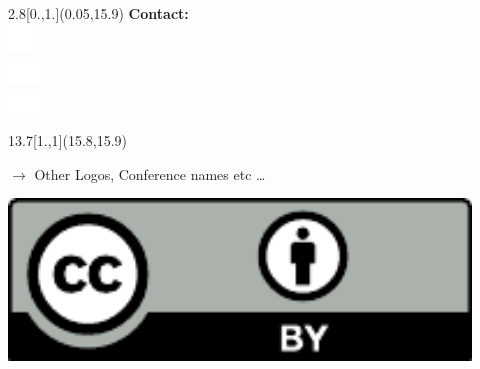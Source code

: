 
\begin{textblock}{2.8}[0.,1.](0.05,15.9)
{\large \sffamily \color{white}
  \noindent \textbf{Contact: \iauthor}\\
\includegraphics[width=8mm,clip]{Internet_Icon_white} \iblog\\
\includegraphics[width=9mm,clip]{Twitter_logo_white} \itweet\\ 
\includegraphics[width=9mm,clip]{e_mail} \iemail
}\end{textblock}






\begin{textblock}{13.7}[1.,1](15.8,15.9)
    \begin{minipage}[b][4.4cm][c]{0.8\textwidth}\flushright
    \textcolor{unigrau}{{\Large  $\rightarrow$ Other Logos, Conference names etc \ldots}}
  \end{minipage}
  \begin{minipage}[b][4.4cm][c]{0.2\textwidth}\flushright
    \noindent\includegraphics[height=4.3cm,clip]{CCby}
  \end{minipage}
\end{textblock}

	      

